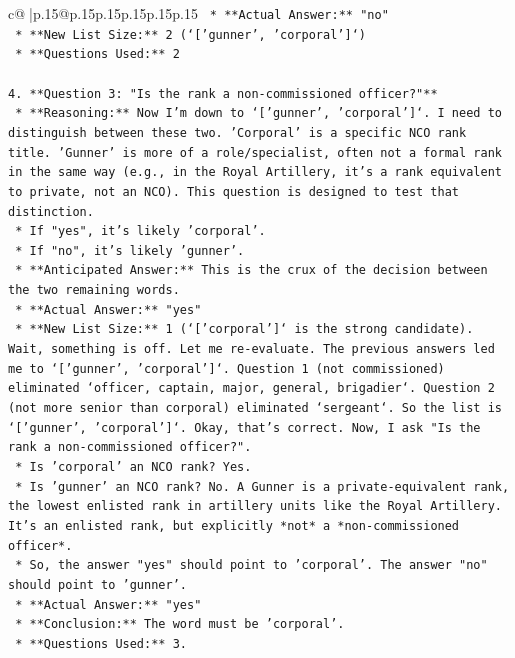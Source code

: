 \documentclass{article}
\begin{document}
{\begin{supertabular}{c@{$\;$}|p{.15\linewidth}@{}p{.15\linewidth}p{.15\linewidth}p{.15\linewidth}p{.15\linewidth}p{.15\linewidth}}
{{{\texttt{    *   **Actual Answer:** "no"} \\
\texttt{    *   **New List Size:** 2 (`{[}'gunner', 'corporal'{]}`)} \\
\texttt{    *   **Questions Used:** 2} \\
\\ 
\texttt{4.  **Question 3: "Is the rank a non{-}commissioned officer?"**} \\
\texttt{    *   **Reasoning:** Now I'm down to `{[}'gunner', 'corporal'{]}`. I need to distinguish between these two. 'Corporal' is a specific NCO rank title. 'Gunner' is more of a role/specialist, often not a formal rank in the same way (e.g., in the Royal Artillery, it's a rank equivalent to private, not an NCO). This question is designed to test that distinction.} \\
\texttt{        *   If "yes", it's likely 'corporal'.} \\
\texttt{        *   If "no", it's likely 'gunner'.} \\
\texttt{    *   **Anticipated Answer:** This is the crux of the decision between the two remaining words.} \\
\texttt{    *   **Actual Answer:** "yes"} \\
\texttt{    *   **New List Size:** 1 (`{[}'corporal'{]}` is the strong candidate). Wait, something is off. Let me re{-}evaluate. The previous answers led me to `{[}'gunner', 'corporal'{]}`. Question 1 (not commissioned) eliminated `officer, captain, major, general, brigadier`. Question 2 (not more senior than corporal) eliminated `sergeant`. So the list is `{[}'gunner', 'corporal'{]}`. Okay, that's correct. Now, I ask "Is the rank a non{-}commissioned officer?".} \\
\texttt{        *   Is 'corporal' an NCO rank? Yes.} \\
\texttt{        *   Is 'gunner' an NCO rank? No. A Gunner is a private{-}equivalent rank, the lowest enlisted rank in artillery units like the Royal Artillery. It's an enlisted rank, but explicitly *not* a *non{-}commissioned officer*.} \\
\texttt{    *   So, the answer "yes" should point to 'corporal'. The answer "no" should point to 'gunner'.} \\
\texttt{    *   **Actual Answer:** "yes"} \\
\texttt{    *   **Conclusion:** The word must be 'corporal'.} \\
\texttt{    *   **Questions Used:** 3.} \\
\\ 
}}}
\end{supertabular}}
\end{document}
